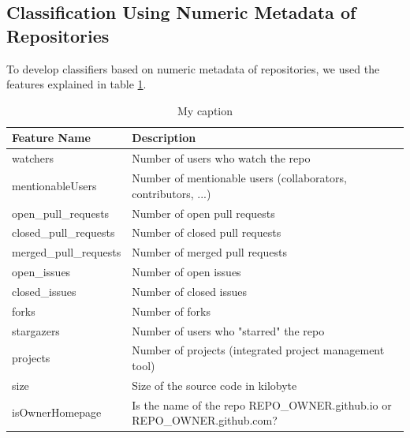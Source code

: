 \documentclass[a4paper,12pt]{article}
\begin{document}
\subsection{Classification Using Numeric Metadata of
Repositories}\label{classification-using-numeric-metadata-of-repositories}

To develop classifiers based on numeric metadata of repositories, we
used the features explained in table \ref{features}.

\begin{table}[]
\centering
\caption{My caption}
\label{features}
\begin{tabularx}{\linewidth}{|l|X|}
\hline
Feature Name           & Description                                                                        \\ \hline
watchers               & Number of users who watch the repo                                                 \\ \hline
mentionableUsers       & Number of mentionable users (collaborators, contributors, ...)                     \\ \hline
open\_pull\_requests   & Number of open pull requests                                                       \\ \hline
closed\_pull\_requests & Number of closed pull requests                                                     \\ \hline
merged\_pull\_requests & Number of merged pull requests                                                     \\ \hline
open\_issues           & Number of open issues                                                              \\ \hline
closed\_issues         & Number of closed issues                                                            \\ \hline
forks                  & Number of forks                                                                    \\ \hline
stargazers             & Number of users who "starred" the repo                                             \\ \hline
projects               & Number of projects (integrated project management tool)                            \\ \hline
size                   & Size of the source code in kilobyte                                                \\ \hline
isOwnerHomepage        & Is the name of the repo REPO\_OWNER.github.io or REPO\_OWNER.github.com?         \\ \hline

\end{tabularx}
\end{table}
\end{document}
